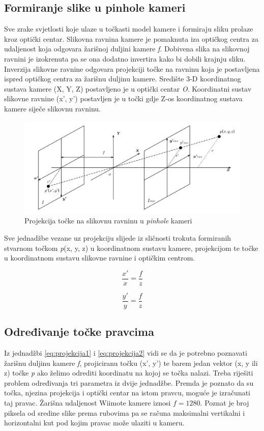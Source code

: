\documentclass[times, utf8, diplomski]{fer}
\begin{document}
\subsection{Formiranje slike u pinhole kameri}
Sve zrake svjetlosti koje ulaze u točkasti model kamere i formiraju sliku prolaze kroz optički centar. Slikovna ravnina kamere je pomaknuta iza optičkog centra za udaljenost koja odgovara žarišnoj duljini kamere \textit{f}. Dobivena slika na slikovnoj ravnini je izokrenuta pa se ona dodatno invertira kako bi dobili krajnju sliku. Inverzija slikovne ravnine odgovara projekciji točke na ravninu koja je postavljena ispred optičkog centra za žarišnu duljinu kamere. Središte 3-D koordinatnog sustava kamere (X, Y, Z) postavljeno je u optički centar \textit{O}. Koordinatni sustav slikovne ravnine (x', y') postavljen je u točki gdje Z-os koordinatnog sustava kamere siječe slikovnu ravninu.

\begin{figure}[h]
\centering
\includegraphics[width=.9\textwidth]{projekcija}
\caption{Projekcija točke na slikovnu ravninu u \textit{pinhole} kameri}
\label{fig:projekcija}
\end{figure}

Sve jednadžbe vezane uz projekciju slijede iz sličnosti trokuta formiranih stvarnom točkom \textit{p}(x, y, z) u koordinatnom sustavu kamere, projekcijom te točke u koordinatnom sustavu slikovne ravnine i optičkim centrom.

\begin{equation}
\frac{x'}{x} = \frac{f}{z}
\label{eq:projekcija1}
\end{equation}

\begin{equation}
\frac{y'}{y} = \frac{f}{z}
\label{eq:projekcija2}
\end{equation}

\subsection{Određivanje točke pravcima}
Iz jednadžbi \ref{eq:projekcija1} i \ref{eq:projekcija2} vidi se da je potrebno poznavati žarišnu duljinu kamere \textit{f}, projiciranu točku (x', y') te barem jedan vektor (x, y ili z) točke \textit{p} ako želimo odrediti koordinatu na kojoj se točka nalazi. Treba riješiti problem određivanja tri parametra iz dvije jednadžbe. Premda je poznato da su točka, njezina projekcija i optički centar na istom pravcu, moguće je izračunati taj pravac. Žarišna udaljenost Wiimote kamere iznosi $f=1280$. Poznat je broj piksela od sredine slike prema rubovima pa se računa maksimalni vertikalni i horizontalni kut pod kojim pravac može ulaziti u kameru.
\end{document}
